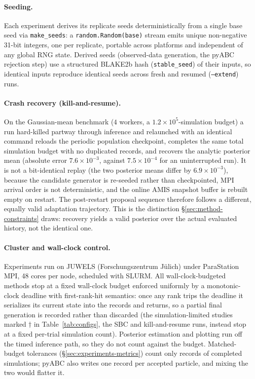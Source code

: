 \documentclass[pdflatex,sn-mathphys-num]{sn-jnl}
\theoremstyle{plain}
\theoremstyle{definition}
\begin{document}
\begin{appendices}
\paragraph{Seeding.} Each experiment derives its replicate seeds deterministically from a single base seed via \texttt{make\_seeds}: a \texttt{random.Random(base)} stream emits unique non-negative 31-bit integers, one per replicate, portable across platforms and independent of any global RNG state. Derived seeds (observed-data generation, the pyABC rejection step) use a structured BLAKE2b hash (\texttt{stable\_seed}) of their inputs, so identical inputs reproduce identical seeds across fresh and resumed (\texttt{--extend}) runs.

\paragraph{Crash recovery (kill-and-resume).} On the Gaussian-mean benchmark ($4$ workers, a $1.2\times10^{5}$-simulation budget) a run hard-killed partway through inference and relaunched with an identical command reloads the periodic population checkpoint, completes the same total simulation budget with no duplicated records, and recovers the analytic posterior mean (absolute error $7.6\times10^{-3}$, against $7.5\times10^{-4}$ for an uninterrupted run). It is not a bit-identical replay (the two posterior means differ by $6.9\times10^{-3}$), because the candidate generator is re-seeded rather than checkpointed, MPI arrival order is not deterministic, and the online AMIS snapshot buffer is rebuilt empty on restart. The post-restart proposal sequence therefore follows a different, equally valid adaptation trajectory. This is the distinction \S\ref{sec:method-constraints} draws: recovery yields a valid posterior over the actual evaluated history, not the identical one.

\paragraph{Cluster and wall-clock control.} Experiments run on JUWELS (Forschungszentrum J\"ulich) under ParaStation MPI, 48 cores per node, scheduled with SLURM. All wall-clock-budgeted methods stop at a fixed wall-clock budget enforced uniformly by a monotonic-clock deadline with first-rank-hit semantics: once any rank trips the deadline it serializes its current state into the records and returns, so a partial final generation is recorded rather than discarded (the simulation-limited studies marked $\dagger$ in Table~\ref{tab:configs}, the SBC and kill-and-resume runs, instead stop at a fixed per-trial simulation count). Posterior estimation and plotting run off the timed inference path, so they do not count against the budget. Matched-budget tolerances (\S\ref{sec:experiments-metrics}) count only records of completed simulations; pyABC also writes one record per accepted particle, and mixing the two would flatter it.


\end{appendices}
\end{document}
